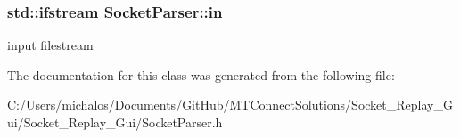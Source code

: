 \subsubsection[{in}]{\setlength{\rightskip}{0pt plus 5cm}std\+::ifstream Socket\+Parser\+::in\hspace{0.3cm}{\ttfamily [protected]}}\label{class_socket_parser_ace4efb971e7adbd8f3053eb06f23d0e8}
input filestream 

The documentation for this class was generated from the following file\+:\begin{DoxyCompactItemize}
\item 
C\+:/\+Users/michalos/\+Documents/\+Git\+Hub/\+M\+T\+Connect\+Solutions/\+Socket\+\_\+\+Replay\+\_\+\+Gui/\+Socket\+\_\+\+Replay\+\_\+\+Gui/Socket\+Parser.\+h\end{DoxyCompactItemize}
